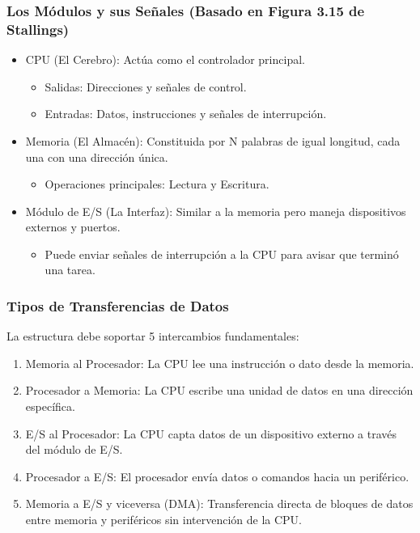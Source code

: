 \documentclass{article}
\begin{document}
\subsubsection{Los Módulos y sus Señales (Basado en Figura 3.15 de Stallings)}
\label{sec:org928b7e6}
\begin{itemize}
\item CPU (El Cerebro): Actúa como el controlador principal.
\begin{itemize}
\item Salidas: Direcciones y señales de control.
\item Entradas: Datos, instrucciones y señales de interrupción.
\end{itemize}
\item Memoria (El Almacén): Constituida por N palabras de igual longitud,
cada una con una dirección única. 
\begin{itemize}
\item Operaciones principales: Lectura y Escritura.
\end{itemize}
\item Módulo de E/S (La Interfaz): Similar a la memoria pero maneja
dispositivos externos y puertos. 
\begin{itemize}
\item Puede enviar señales de interrupción a la CPU para avisar que
terminó una tarea.
\end{itemize}
\end{itemize}

\subsubsection{Tipos de Transferencias de Datos}
\label{sec:orgce3a666}
La estructura debe soportar 5 intercambios fundamentales:
\begin{enumerate}
\item Memoria al Procesador: La CPU lee una instrucción o dato desde la
memoria.
\item Procesador a Memoria: La CPU escribe una unidad de datos en una
dirección específica.
\item E/S al Procesador: La CPU capta datos de un dispositivo externo a
través del módulo de E/S.
\item Procesador a E/S: El procesador envía datos o comandos hacia un
periférico.
\item Memoria a E/S y viceversa (DMA): Transferencia directa de bloques
de datos entre memoria y periféricos sin intervención de la CPU.
\end{enumerate}
\end{document}

